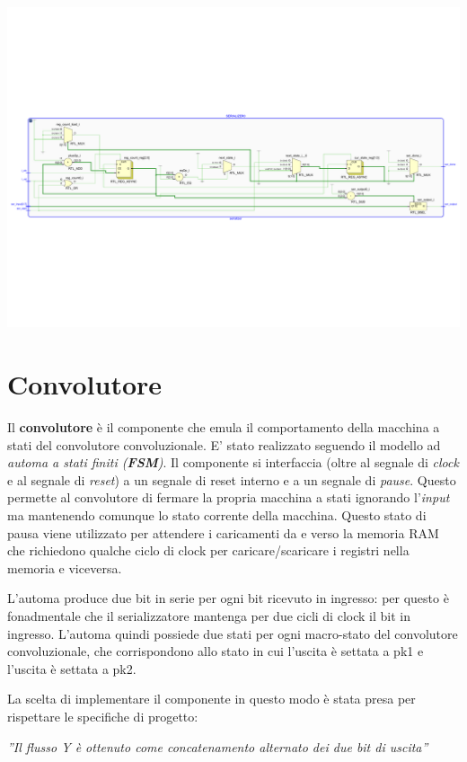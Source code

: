 \documentclass[a4paper]{report}
\begin{document}
\includegraphics[scale = 0.45]{schematics/serializer.pdf}

\section{Convolutore}
Il \textbf{convolutore} è il componente che emula il comportamento della macchina a stati del convolutore convoluzionale. E' stato realizzato seguendo il modello ad \textit{automa a stati finiti (\textbf{FSM})}.
Il componente si interfaccia (oltre al segnale di \textit{clock} e al segnale di \textit{reset}) a un segnale di reset interno e a un segnale di \textit{pause}. Questo permette al convolutore di fermare la propria macchina a stati ignorando l'\textit{input} ma mantenendo comunque lo stato corrente della macchina. Questo stato di pausa viene utilizzato per attendere i caricamenti da e verso la memoria RAM che richiedono qualche ciclo di clock per caricare/scaricare i registri nella memoria e viceversa. 

L'automa produce due bit in serie per ogni bit ricevuto in ingresso: per questo è fonadmentale che il serializzatore mantenga per due cicli di clock il bit in ingresso. L'automa quindi possiede due stati per ogni macro-stato del convolutore convoluzionale, che corrispondono allo stato in cui l'uscita è settata a pk1 e l'uscita è settata a pk2.

La scelta di implementare il componente in questo modo è stata presa per rispettare le specifiche di progetto:
\begin{displayquote}
  \textit{''Il flusso Y è ottenuto come concatenamento alternato dei due bit di uscita''}
\end{displayquote}
\end{document}
